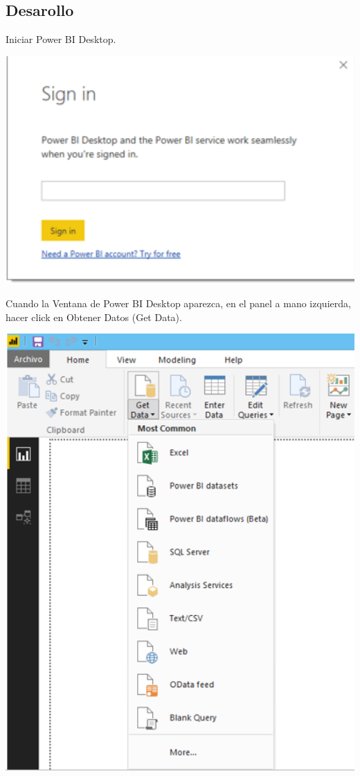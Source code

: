 \documentclass[12pt,letterpaper]{article}
\begin{document}
\subsection*{Desarollo}
Iniciar Power BI Desktop.
\begin{center}
    \includegraphics[width=16cm]{img/1.png}  
\end{center}
Cuando la Ventana de Power BI Desktop aparezca, en el panel a mano izquierda, hacer click en Obtener
Datos (Get Data).
\begin{center}
    \includegraphics[width=16cm]{img/2.png}  
\end{center}
\end{document}
